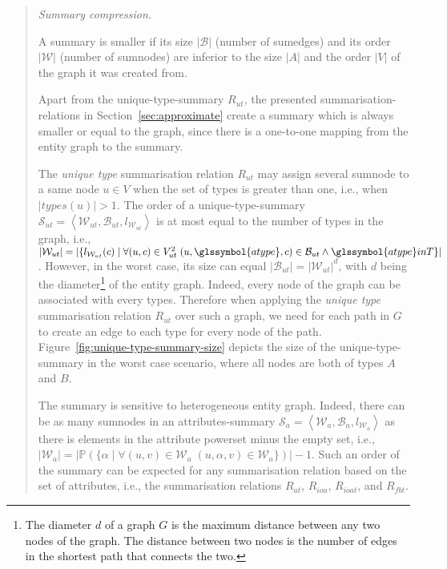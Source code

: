 \begin{quotation}
	\item[\emph{Summary compression.}]

	A summary is smaller if its size $\vert \mathcal{B} \vert$ (number of sumedges) and its order $\vert \mathcal{W} \vert$ (number of sumnodes) are inferior to the size $\vert A \vert$ and the order $\vert V \vert$ of the graph it was created from.

	Apart from the \gls{unique-type-summary} $R_{ut}$, the presented \glspl{summarisation-relation} in Section~\ref{sec:approximate} create a summary which is always smaller or equal to the graph, since there is a one-to-one mapping from the entity graph to the summary.

	The \emph{unique type} summarisation relation $R_{ut}$ may assign several sumnode to a same node $u \in V$ when the set of \gls{types} is greater than one, i.e., when $\vert types(u) \vert > 1$. The order of a \gls{unique-type-summary} $\mathcal{S}_{ut} = \left\langle \mathcal{W}_{ut}, \mathcal{B}_{ut}, l_{\mathcal{W}_{ut}} \right\rangle$ is at most equal to the number of types in the graph, i.e., $\vert \mathcal{W}_{ut} \vert = \vert \{ l_{\mathcal{W}_{ut}}(c) \mid \forall (u, c) \in V^2_{ut}\; (u, \glssymbol{atype}, c) \in \mathcal{B}_{ut} \wedge \glssymbol{atype} in T \} \vert$. However, in the worst case, its size can equal $\vert \mathcal{B}_{ut} \vert = \vert \mathcal{W}_{ut} \vert ^d$, with $d$ being the diameter\footnote{The diameter $d$ of a graph $G$ is the maximum distance between any two nodes of the graph. The distance between two nodes is the number of edges in the shortest path that connects the two.} of the entity graph. Indeed, every node of the graph can be associated with every types. Therefore when applying the \emph{unique type} summarisation relation $R_{ut}$ over such a graph, we need for each path in $G$ to create an edge to each type for every node of the path. Figure~\ref{fig:unique-type-summary-size} depicts the size of the \gls{unique-type-summary} in the worst case scenario, where all nodes are both of types $A$ and $B$.

	The summary is sensitive to heterogeneous entity graph. Indeed, there can be as many sumnodes in an \gls{attributes-summary} $\mathcal{S}_a = \left\langle \mathcal{W}_{a}, \mathcal{B}_{a}, l_{\mathcal{W}_{a}} \right\rangle$ as there is elements in the attribute powerset minus the empty set, i.e., $\vert \mathcal{W}_a \vert = \vert \mathbb{P} \left( \{ \alpha \mid \forall (u, v) \in \mathcal{W}_a\; (u, \alpha, v) \in \mathcal{W}_a \} \right) \vert - 1$. Such an order of the summary can be expected for any summarisation relation based on the set of \gls{attributes}, i.e., the summarisation relations $R_{at}$, $R_{ioa}$, $R_{ioat}$, and $R_{fbt}$.\\


\end{quotation}
